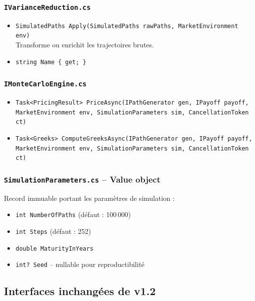 \documentclass[a4paper,11pt]{article}
\newcommand{\cs}[1]{\texttt{\color{codeinline}#1}}
\begin{document}
\subsubsection{\texttt{IVarianceReduction.cs}}

\begin{itemize}[leftmargin=1.5em]
  \item \cs{SimulatedPaths Apply(SimulatedPaths rawPaths, MarketEnvironment env)} \\
        Transforme ou enrichit les trajectoires brutes.
  \item \cs{string Name \{ get; \}}
\end{itemize}

\subsubsection{\texttt{IMonteCarloEngine.cs}}

\begin{itemize}[leftmargin=1.5em]
  \item \cs{Task<PricingResult> PriceAsync(IPathGenerator gen, IPayoff payoff,}\\
        \cs{MarketEnvironment env, SimulationParameters sim, CancellationToken ct)}
  \item \cs{Task<Greeks> ComputeGreeksAsync(IPathGenerator gen, IPayoff payoff,}\\
        \cs{MarketEnvironment env, SimulationParameters sim, CancellationToken ct)}
\end{itemize}

\subsubsection{\texttt{SimulationParameters.cs} -- Value object}

Record immuable portant les param\`etres de simulation :
\begin{itemize}[leftmargin=1.5em]
  \item \cs{int NumberOfPaths} (d\'efaut : 100\,000)
  \item \cs{int Steps} (d\'efaut : 252)
  \item \cs{double MaturityInYears}
  \item \cs{int? Seed} -- nullable pour reproductibilit\'e
\end{itemize}

\subsection{Interfaces inchang\'ees de v1.2}
\end{document}
